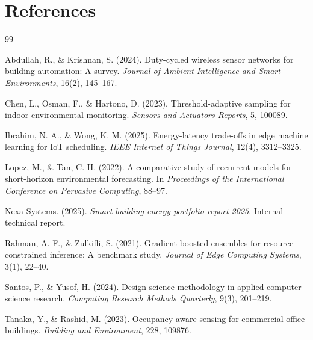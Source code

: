 \chapter*{References}
\begin{thebibliography}{99}

 Abdullah, R., \& Krishnan, S. (2024). Duty-cycled wireless sensor networks
for building automation: A survey. \textit{Journal of Ambient Intelligence and Smart Environments},
16(2), 145--167.

 Chen, L., Osman, F., \& Hartono, D. (2023). Threshold-adaptive sampling for
indoor environmental monitoring. \textit{Sensors and Actuators Reports}, 5, 100089.

 Ibrahim, N. A., \& Wong, K. M. (2025). Energy-latency trade-offs in edge
machine learning for IoT scheduling. \textit{IEEE Internet of Things Journal}, 12(4), 3312--3325.

 Lopez, M., \& Tan, C. H. (2022). A comparative study of recurrent models for
short-horizon environmental forecasting. In \textit{Proceedings of the International Conference on
Pervasive Computing}, 88--97.

 Nexa Systems. (2025). \textit{Smart building energy portfolio report 2025}.
Internal technical report.

 Rahman, A. F., \& Zulkifli, S. (2021). Gradient boosted ensembles for
resource-constrained inference: A benchmark study. \textit{Journal of Edge Computing Systems},
3(1), 22--40.

 Santos, P., \& Yusof, H. (2024). Design-science methodology in applied
computer science research. \textit{Computing Research Methods Quarterly}, 9(3), 201--219.

 Tanaka, Y., \& Rashid, M. (2023). Occupancy-aware sensing for commercial
office buildings. \textit{Building and Environment}, 228, 109876.

\end{thebibliography}

\appendix
